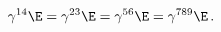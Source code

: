 \begin{equation}
\gamma^{14}\E=\gamma^{23}\E=\gamma^{56}\E=\gamma^{789}\E\,.\label{GGE}
\end{equation}

